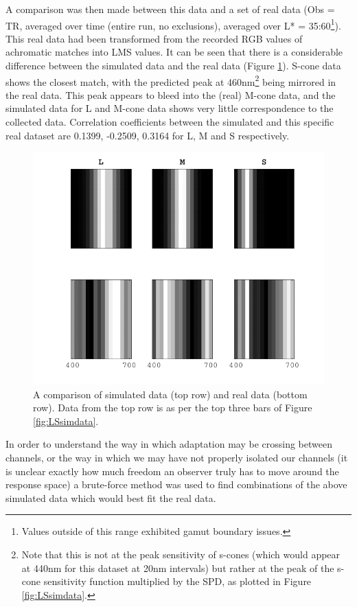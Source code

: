 A comparison was then made between this data and a set of real data (Obs = TR, averaged over time (entire run, no exclusions), averaged over L* = 35:60\footnote{Values outside of this range exhibited gamut boundary issues.}). This real data had been transformed from the recorded RGB values of achromatic matches into LMS values. It can be seen that there is a considerable difference between the simulated data and the real data (Figure \ref{fig:simVreal}). S-cone data shows the closest match, with the predicted peak at 460nm\footnote{Note that this is not at the peak sensitivity of s-cones (which would appear at 440nm for this dataset at 20nm intervals) but rather at the peak of the s-cone sensitivity function multiplied by the \gls{SPD}, as plotted in Figure \ref{fig:LSsimdata}.} being mirrored in the real data. This peak appears to bleed into the (real) M-cone data, and the simulated data for L and M-cone data shows very little correspondence to the collected data. Correlation coefficients between the simulated and this specific real dataset are 0.1399, -0.2509, 0.3164 for L, M and S respectively.

\begin{figure}[htbp]
\includegraphics[max width=\textwidth]{figs/LargeSphere/simVreal.pdf}
\caption{A comparison of simulated data (top row) and real data (bottom row). Data from the top row is as per the top three bars of Figure \ref{fig:LSsimdata}.}
\label{fig:simVreal}
\end{figure}

In order to understand the way in which adaptation may be crossing between channels, or the way in which we may have not properly isolated our channels (it is unclear exactly how much freedom an observer truly has to move around the response space) a brute-force method was used to find combinations of the above simulated data which would best fit the real data.

